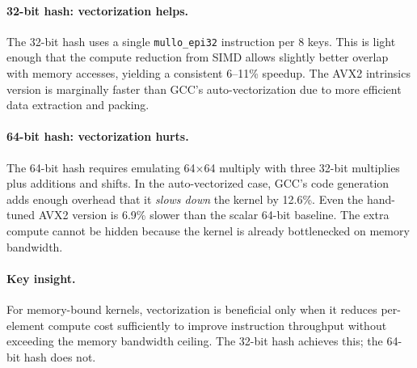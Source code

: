 \documentclass[11pt,a4paper]{article}
\begin{document}
\paragraph{32-bit hash: vectorization helps.} The 32-bit hash uses a single \texttt{mullo\_epi32} instruction per 8 keys. This is light enough that the compute reduction from SIMD allows slightly better overlap with memory accesses, yielding a consistent 6--11\% speedup. The AVX2 intrinsics version is marginally faster than GCC's auto-vectorization due to more efficient data extraction and packing.

\paragraph{64-bit hash: vectorization hurts.} The 64-bit hash requires emulating 64$\times$64 multiply with three 32-bit multiplies plus additions and shifts. In the auto-vectorized case, GCC's code generation adds enough overhead that it \emph{slows down} the kernel by 12.6\%. Even the hand-tuned AVX2 version is 6.9\% slower than the scalar 64-bit baseline. The extra compute cannot be hidden because the kernel is already bottlenecked on memory bandwidth.

\paragraph{Key insight.} For memory-bound kernels, vectorization is beneficial only when it reduces per-element compute cost sufficiently to improve instruction throughput without exceeding the memory bandwidth ceiling. The 32-bit hash achieves this; the 64-bit hash does not.
\end{document}
